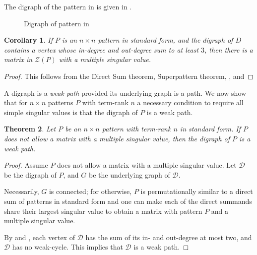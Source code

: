 \documentclass[preprint,12pt]{elsarticle}
\newtheorem{theorem}{Theorem}[section]
\newtheorem{corollary}[theorem]{Corollary}
\begin{document}
The digraph of the pattern in  is
given in .
\begin{figure}
\begin{center} 
\caption{
  {Digraph of pattern in }}
    \label{fig1}
\end{center}
\end{figure} 

\begin{corollary}
\label{degforbid}
If $P$ is an $n\times n$ pattern in standard form, 
and the digraph of $D$ contains a vertex whose 
in-degree and out-degree sum to at least $3$, 
then there is a matrix in $\mathcal{Z}(P)$
with a multiple singular value. 
\end{corollary}
\begin{proof}
 This follows from the  Direct Sum theorem,  Superpattern theorem, , and  
 \end{proof}


A digraph is a \textit{weak path} provided 
its underlying graph is a path. We now show that for $n\times n $ patterns $P$ with term-rank $n$ a necessary condition to require all simple singular values is that the digraph of $P$ is a weak path. 


\begin{theorem}
\label{th:weakpath}
Let $P$ be an $n\times n$ pattern with term-rank $n$ in standard form.
If $P$ does not allow a matrix with a multiple singular value, then the digraph of $P$ 
is a weak path. 
\end{theorem}

\begin{proof}
Assume $P$ does not allow a matrix with a multiple singular value.
Let $\mathcal{D}$ be the digraph of $P$, and $G$ be the underlying graph of $\mathcal{D}$.  

Necessarily, $G$ is connected; for otherwise, 
$P$ is permutationally similar to a direct sum of patterns in standard form and one can make each of the direct summands share their largest singular value to obtain a matrix with pattern $P$ and a multiple singular value.

By  and ,
each vertex of $\mathcal{D}$  has the sum of its in-
and out-degree at most two, and $\mathcal{D}$
has no weak-cycle. This implies that 
$\mathcal{D}$
is a weak path.
\end{proof}
\end{document}
